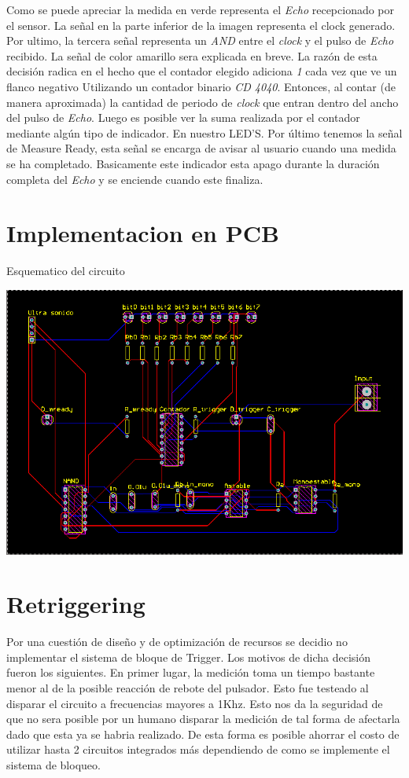 Como se puede apreciar la medida en verde representa el \emph{Echo} recepcionado por el sensor.
La señal en la parte inferior de la imagen representa el clock generado. Por ultimo, la tercera señal representa un \emph{AND} entre el \emph{clock} y el pulso de \emph{Echo} recibido. La señal de color amarillo sera explicada en breve. 
La razón de esta decisión radica en el hecho que el contador elegido adiciona \emph{1} cada vez que ve un flanco negativo
Utilizando un contador binario \emph{CD 4040}. Entonces, al contar (de manera aproximada) la cantidad de periodo de \emph{clock} que entran dentro del ancho del pulso de \emph{Echo}. Luego es posible ver la suma realizada por el contador mediante algún tipo de indicador. En nuestro LED'S. 
Por último tenemos la señal de Measure Ready, esta señal se encarga de avisar al usuario cuando una medida se ha completado. Basicamente este indicador esta apago durante la duración completa del \emph{Echo} y se enciende cuando este finaliza.
\section{Implementacion en PCB}
Esquematico del circuito
\begin{center}
\includegraphics[scale=0.6]{../8-UltraSound/pcb.png}
\end{center}

\section{Retriggering}
Por una cuestión de diseño y de optimización de recursos se decidio no implementar el sistema de bloque de Trigger. Los motivos de dicha decisión fueron los siguientes. En primer lugar, la medición toma un tiempo bastante menor al de la posible reacción de rebote del pulsador. Esto fue testeado al disparar el circuito a frecuencias mayores a 1Khz. Esto nos da la seguridad de que no sera posible por un humano disparar la medición de tal forma de afectarla dado que esta ya se habria realizado. De esta forma es posible ahorrar el costo de utilizar hasta 2 circuitos integrados más dependiendo de como se implemente el sistema de bloqueo.





